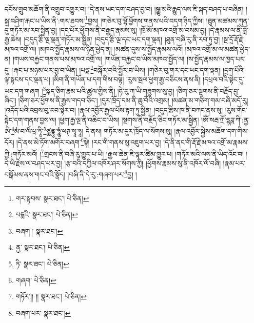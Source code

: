 དངོས་གྲུབ་མཆོག་ནི་འགྲུབ་འགྱུར་བ། །དེ་ནས་ཡང་དག་བཤད་བྱ་བ། །སྒྱུ་མའི་རྒྱུད་ལས་ཇི་སྐད་བཤད་པ་བཞིན། །སྐྲ་བཤིག་རྐང་པ་ཡིས་ནི་:གར་ཐབས་\footnote{གར་སྟབས་  སྣར་ཐང་།  པེ་ཅིན། }བྱས། །གཅེར་བུ་ལྷོ་ཕྱོགས་གནས་པའི་བདག་ཉིད་ཀྱིས། །ཐུན་མཚམས་ཀུན་དུ་གཏོར་མ་རབ་སྦྱིན་བྱ། །དང་པོར་ཕྱོགས་ནི་བརྒྱད་རྣམས་སུ། །ཁྲོ་མོ་མཁའ་འགྲོ་མ་བསམ་བྱ། །དེ་རྣམས་ལ་ནི་བློ་རྒྱ་ཆེས། །བདུད་རྩི་ལྔ་ལྡན་གཏོར་མ་སྦྱིན། །བདུད་རྩི་ལྔ་དང་ཡང་དག་ལྡན། །ཐུན་བཞི་རུ་ནི་རབ་ཏུ་བྱ། །སྔ་དྲོ་རྡོ་རྗེ་མཁའ་འགྲོ་ལ། །མཁའ་སྤྱོད་རྣམས་ལ་ཉིན་ཕྱེད་ན། །མཚན་དུས་ས་སྤྱོད་རྣམས་ལའོ། །མཁའ་འགྲོ་མ་ལ་མཚན་ཕྱེད་ན། །གཡས་བརྐྱང་གནས་པས་མཁའ་འགྲོ་ལ། །གཡོན་བརྐྱང་བ་ཡིས་མཁའ་སྤྱོད་ལ། །ས་སྤྱོད་རྣམས་ལ་ཁྱད་པར་དུ། །རྐང་པ་མཉམ་པར་བྱ་བ་ཡིན། །པདྨ་\footnote{པདྨའི་  སྣར་ཐང་།  པེ་ཅིན། }བསྐོར་བའི་སྦྱོར་བ་ཡིས། །གཅེར་བུ་གར་དང་ཡང་དག་ལྡན། །དྲག་པོའི་ལྟ་སྟངས་དང་ལྡན་པ། །མིག་ནི་གཡོན་པ་དག་གིས་བལྟ། །རུས་སྦལ་ཕྱག་རྒྱ་བཅིངས་ནས་ནི། །དཔྲལ་བའི་སྟེང་དུ་ཡང་དག་གཞག །\footnote{བཞག །  སྣར་ཐང་། }སྐད་ཅིག་རྣམ་པའི་ཚུལ་གྱིས་ནི། །ཧེ་རུ་ཀ་ཡི་གཟུགས་སུ་བྱ། །ཅིག་ཅར་སྔགས་ནི་བརྗོད་བྱ་ཞིང་། །ཅིག་ཅར་ཕྱོགས་ནི་རྒྱས་གདབ་ཅིང་། །དུར་ཁྲོད་དམ་ནི་ཆུ་བོའི་འགྲམ། །མཚན་མ་གཅིག་གམ་བཞི་མདོ་རུ། །འདོད་པའི་འབྲས་བུ་རབ་སྟེར་བ། །རྣལ་འབྱོར་རྒྱལ་པོས་རྟག་ཏུ་སྦྱིན། །བདུད་རྩིས་ཁ་ནི་བཀང་ནས་སུ། །རུས་གོང་སྟེང་དག་གནས་བྱས་ལ། །ཕྱག་རྒྱ་ལྔ་ནི་འཆིང་བ་ཡིས། །སྔགས་ནི་བརྗོད་ཅིང་གཏོར་མ་སྦྱིན། །ཨོཾ་སརྦ་ཀྲོ་དྷཌཱ་ཀི་:ནྱ་ཨི་\footnote{ནྱ་  སྣར་ཐང་།  པེ་ཅིན། }མཾ་བ་ལིཾ་པྲ་ཏཱི་\footnote{ཏི་  སྣར་ཐང་།  པེ་ཅིན། }ཙྪནྟུ་ཧཱུཾ་ཕཊ་སྭཱ་ཧཱ། དེ་ནས། གཏོར་མ་དུར་ཁྲོད་ལ་སོགས་སུ། །རྣལ་འབྱོར་སྐྱེས་མཆོག་དག་གིས་དོར། །དེ་ནས་མེ་ཏོག་མགོར་བཞག་\footnote{གཞག་  པེ་ཅིན། }སྟེ། །རང་གི་གནས་སུ་འཇུག་པར་བྱ། །དེ་ནི་ནང་གི་རྡོ་རྗེ་མཁའ་འགྲོ་མ་རྣམས་ཀྱི་:གཏོར་མའོ། །\footnote{གཏོར་།། །།  སྣར་ཐང་།  པེ་ཅིན། }གྲངས་ནི་བཞི་རུ་གྱུར་པ་ཡི། །རྒྱལ་ཆེན་ཇི་ལྟར་ཚིམ་གྱུར་པ། །གཏོར་མའི་ལས་ནི་ཡིད་འོང་བ། །དེ་ཡི་རྗེས་ལ་བཤད་པར་བྱ། །རྩ་བའི་དཀྱིལ་འཁོར་ཤར་སོགས་ཀྱི། །ཕྱོགས་རྣམས་སུ་ནི་འཁོར་ལོ་བཞི། །རྣམ་པར་བསྒོམས་ནས་གང་བའི་སྣོད། །བཞི་ནི་དེ་རུ་:གཞག་པར་\footnote{བཞག་པར་  སྣར་ཐང་། }བྱ། །
